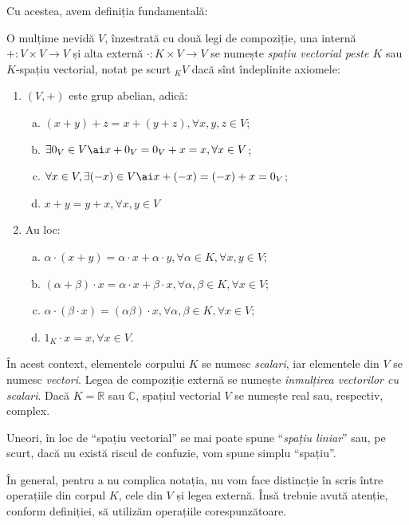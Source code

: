 Cu acestea, avem definiția fundamentală:
\begin{definition}
O mulțime nevidă $V$, înzestrată cu două legi de compoziție, una internă 
$+ : V \times V \to V$ și alta externă $\cdot : K \times V \to V$ se 
numește \emph{spațiu vectorial peste $K$} sau $K$-spațiu vectorial, 
notat pe scurt $_K V$ dacă sînt îndeplinite axiomele:
\begin{enumerate}[(1)]
\item $(V, +)$ este grup abelian, adică:
\begin{enumerate}[(a)]
    \item $(x + y) + z = x + (y + z), \forall x,y,z \in V$;
    \item $\exists 0_V \in V \ai x + 0_V = 0_V + x = x, \forall x \in V$;
    \item $\forall x \in V, \exists (-x) \in V \ai x + (-x) = (-x)+x = 0_V$;
    \item $x + y = y + x, \forall x, y \in V$
\end{enumerate}
\item Au loc:
\begin{enumerate}[(a)]
    \item $\alpha \cdot (x + y) = \alpha \cdot x + \alpha \cdot y, 
    \forall \alpha \in K, \forall x,y \in V$;
    \item $(\alpha + \beta) \cdot x = \alpha \cdot x + \beta \cdot x, 
    \forall \alpha, \beta \in K, \forall x \in V$;
    \item $\alpha \cdot (\beta \cdot x) = (\alpha \beta) \cdot x, 
    \forall \alpha,\beta \in K, \forall x \in V$;
    \item $1_K \cdot x = x, \forall x \in V$.
\end{enumerate}
\end{enumerate}

În acest context, elementele corpului $K$ se numesc \emph{scalari}, iar 
elementele din $V$ se numesc \emph{vectori}. Legea de compoziție externă se 
numește \emph{înmulțirea vectorilor cu scalari}. Dacă $K = \mathbb{R}$ 
sau $\mathbb{C}$, spațiul vectorial $V$ se numește real sau, respectiv, complex.

Uneori, în loc de \enquote{spațiu vectorial} se mai poate spune 
\enquote{\emph{spațiu liniar}} sau, pe scurt, dacă nu există riscul de 
confuzie, vom spune simplu \enquote{spațiu}.
\end{definition}

În general, pentru a nu complica notația, nu vom face distincție în scris 
între operațiile din corpul $K$, cele din $V$ și legea externă. Însă trebuie 
avută atenție, conform definiției, să utilizăm operațiile corespunzătoare.

